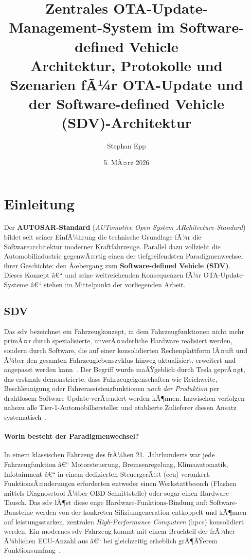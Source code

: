 ﻿\documentclass[12pt,a4paper,twoside]{article}
\title{
  {\textbf{Zentrales OTA-Update-Management-System im Software-defined Vehicle}\\
  {\Large Architektur, Protokolle und Szenarien fÃ¼r OTA-Update und der Software-defined Vehicle (SDV)-Architektur}}
}
\author{Stephan Epp}
\date{5. MÃ¤rz 2026}
\begin{document}
\maketitle

\tableofcontents
\newpage


\section{Einleitung}
\label{sec:einleitung}

Der \textbf{AUTOSAR-Standard} (\textit{AUTomotive Open System ARchitecture-Standard})
bildet seit seiner EinfÃ¼hrung die technische Grundlage fÃ¼r die
Softwarearchitektur moderner Kraftfahrzeuge. Parallel dazu vollzieht die
Automobilindustrie gegenwÃ¤rtig einen der tiefgreifendsten Paradigmenwechsel
ihrer Geschichte: den Ãœbergang zum \textbf{Software-defined Vehicle (SDV)}.
Dieses Konzept â€“ und seine weitreichenden Konsequenzen fÃ¼r OTA-Update-Systeme
â€“ stehen im Mittelpunkt der vorliegenden Arbeit.

\subsection{SDV}
\label{subsec:einl_sdv}

Das \gls{sdv} bezeichnet ein Fahrzeugkonzept, in dem Fahrzeugfunktionen
nicht mehr primÃ¤r durch spezialisierte, unverÃ¤nderliche Hardware realisiert
werden, sondern durch Software, die auf einer konsolidierten
Rechenplattform lÃ¤uft und Ã¼ber den gesamten Fahrzeuglebenszyklus hinweg
aktualisiert, erweitert und angepasst werden kann~\cite{kugele2018sdv}.
Der Begriff wurde maÃŸgeblich durch Tesla geprÃ¤gt, das erstmals demonstrierte,
dass Fahrzeugeigenschaften wie Reichweite, Beschleunigung oder
Fahrerassistenzfunktionen \emph{nach der Produktion} per drahtlosem
Software-Update verÃ¤ndert werden kÃ¶nnen. Inzwischen verfolgen nahezu alle
Tier-1-Automobilhersteller und etablierte Zulieferer diesen Ansatz
systematisch~\cite{halder2020secure}.

\paragraph{Worin besteht der Paradigmenwechsel?}
In einem klassischen Fahrzeug des frÃ¼hen 21.~Jahrhunderts war jede
Fahrzeugfunktion â€“ Motorsteuerung, Bremsenregelung, Klimaautomatik,
Infotainment â€“ in einem dedizierten SteuergerÃ¤t (\gls{ecu}) verankert.
FunktionsÃ¤nderungen erforderten entweder einen Werkstattbesuch (Flashen
mittels Diagnosetool Ã¼ber OBD-Schnittstelle) oder sogar einen
Hardware-Tausch. Das \gls{sdv} lÃ¶st diese enge Hardware-Funktions-Bindung
auf: Software-Bausteine werden von der konkreten Siliziumgeneration
entkoppelt und kÃ¶nnen auf leistungsstarken, zentralen
\textit{High-Performance Computern} (\glspl{hpc}) konsolidiert werden.
Ein modernes \gls{sdv}-Fahrzeug kommt mit einem Bruchteil der frÃ¼her
Ã¼blichen ECU-Anzahl aus â€“ bei gleichzeitig erheblich grÃ¶ÃŸerem
Funktionsumfang~\cite{broy2006challenges}.
\end{document}

